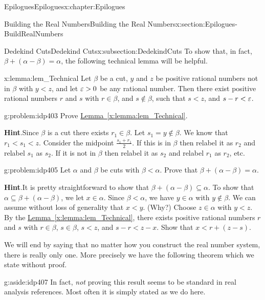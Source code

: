 \begin{chapterptx}{Epilogues}{}{Epilogues}{}{}{x:chapter:Epilogues}
\begin{sectionptx}{Building the Real Numbers}{}{Building the Real Numbers}{}{}{x:section:Epilogues-BuildRealNumbers}
\begin{subsectionptx}{Dedekind Cuts}{}{Dedekind Cuts}{}{}{x:subsection:DedekindCuts}
			To show that, in fact, \(\beta+(\alpha-\beta)=\alpha\), the following technical lemma will be helpful.%
			\begin{lemma}{}{}{x:lemma:lem_Technical}%
				Let \(\beta\) be a cut, \(y\) and \(z\) be positive rational numbers not in \(\beta\) with \(y\lt z\), and let \(\varepsilon>0\) be any rational number. Then there exist positive rational numbers \(r\) and \(s\) with \(r\in\beta\), and \(s\not\in\beta\), such that \(s\lt z\), and \(s-r< \varepsilon\).%
			\end{lemma}
			\begin{problem}{}{g:problem:idp403}%
				Prove \hyperref[x:lemma:lem_Technical]{Lemma~{\xreffont\ref{x:lemma:lem_Technical}}}.%
				\par\smallskip%
				\noindent\textbf{\blocktitlefont Hint}.\hypertarget{g:hint:idp404}{}\quad{}Since \(\beta\) is a cut there exists \(r_1\in\beta\). Let \(s_1=y\not\in\beta\).  We know that \(r_1\lt s_1\lt
				z\).  Consider the midpoint \(\frac{s_1+r_1}{2}\).  If this is in \(\beta\) then relabel it as \(r_2\) and relabel \(s_1\) as \(s_2\).  If it is not in \(\beta\) then relabel it as \(s_2\) and relabel \(r_1\) as \(r_2\), etc.%
			\end{problem}
			\begin{problem}{}{g:problem:idp405}%
				Let \(\alpha\) and \(\beta\) be cuts with \(\beta\lt
				\alpha\).  Prove that \(\beta+(\alpha-\beta)=\alpha\).%
				\par\smallskip%
				\noindent\textbf{\blocktitlefont Hint}.\hypertarget{g:hint:idp406}{}\quad{}It is pretty straightforward to show that \(\beta+(\alpha-\beta)\subseteq\alpha\).  To show that \(\alpha\subseteq\beta+(\alpha-\beta)\), we let \(x\in\alpha\).  Since \(\beta\lt \alpha\), we have \(y\in\alpha\) with \(y\not\in\beta\). We can assume without loss of generality that \(x\lt
				y\). (Why?) Choose \(z\in\alpha\) with \(y\lt
				z\).  By the \hyperref[x:lemma:lem_Technical]{Lemma~{\xreffont\ref{x:lemma:lem_Technical}}}, there exists positive rational numbers \(r\) and \(s\) with \(r\in\beta\), \(s\in\beta\), \(s\lt z\), and \(s-r\lt z-x\).  Show that \(x\lt r+(z-s)\).%
			\end{problem}
			We will end by saying that no matter how you construct the real number system, there is really only one.  More precisely we have the following theorem which we state without proof.%
			\begin{aside}{}{g:aside:idp407}%
				In fact, \emph{not} proving this result seems to be standard in real analysis references.  Most often it is simply stated as we do here.%

\end{aside}
\end{subsectionptx}
\end{sectionptx}
\end{chapterptx}
